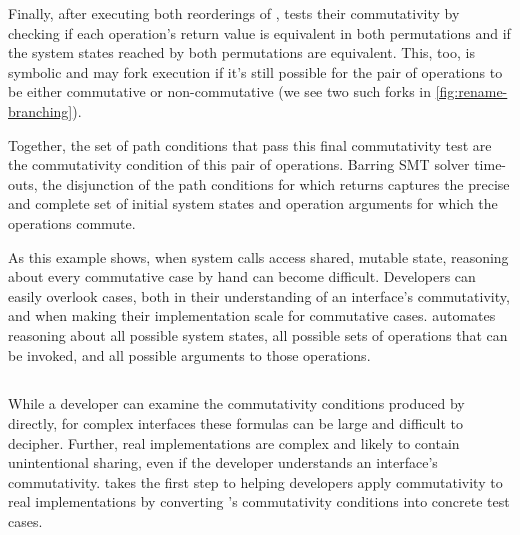 Finally, after executing both reorderings of ,
 tests their commutativity by checking if each
operation's return value is equivalent in both permutations and if the
system states reached by both permutations are equivalent.  This, too,
is symbolic and may fork execution if it's still possible for the pair
of operations to be either commutative or non-commutative (we see two
such forks in \cref{fig:rename-branching}).

Together, the set of path conditions that pass this final
commutativity test are the commutativity condition of this pair of
operations.  Barring SMT solver time-outs, the disjunction of the path
conditions for which  returns  captures the
precise and complete set of initial system states and operation
arguments for which
the operations commute.

As this example shows, when system calls access shared, mutable
state, reasoning about every commutative case by hand can become
difficult.
%
Developers can easily overlook cases, both in their
understanding of an interface's commutativity, and when making their
implementation scale for commutative cases.
%
\analyzer
automates reasoning about all possible system states, all possible
sets of operations that can be
invoked, and all possible arguments to those operations.



\subsection{\testgen}
\label{sec:tool:generator}

While a developer can examine the commutativity conditions
produced by \analyzer directly, for complex interfaces these formulas
can be large and difficult to decipher.  Further, real implementations
are complex and likely to contain unintentional sharing, even if the
developer understands an interface's commutativity.  \testgen takes
the first step to helping developers apply commutativity to real
implementations by converting \analyzer's commutativity conditions into
concrete test cases.

